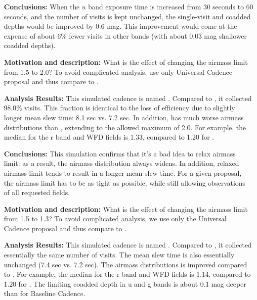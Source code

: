 {\bf Conclusions:} When the $u$ band exposure time is increased from
30 seconds to 60 seconds, and the number of visits is kept unchanged,
the single-visit and coadded depths would be improved by 0.6 mag. This
improvement would come at  the expense of about 6\% fewer visits in
other bands (with about 0.03 mag shallower coadded depths).




{\bf Motivation and description:}  What is the effect of changing the
airmass limit from 1.5 to 2.0?  To avoid complicated analysis, use
only Universal Cadence proposal and thus compare to
.


{\bf Analysis Results:}  This simulated cadence is named
.  Compared to
, it collected 98.0\% visits. This fraction is
identical to the loss of efficiency due to slightly longer mean slew
time: 8.1 sec vs. 7.2 sec. In addition,
 has much worse airmass
distributions than ,  extending to the allowed
maximum of 2.0. For example, the median for the r band and WFD fields
is 1.33, compared to 1.20 for .

{\bf Conclusions:} This simulation confirms that it's a bad idea to
relax airmass limit: as a result, the airmass distribution always
widens. In addition, relaxed airmass limit tends to result in a longer
mean slew time.  For a given proposal, the airmass limit has to be as
tight as possible, while still allowing observations of all requested
fields.




{\bf Motivation and description:} What is the effect of changing the
airmass limit from 1.5 to 1.3? To avoid complicated analysis, we use
only the Universal Cadence proposal and thus compare to
.

 {\bf Analysis Results:}  This simulated cadence is named
 . Compared to
 , it collected essentially the same number of
 visits. The mean slew time is also essentially unchanged (7.4 sec vs.
 7.2 sec). The airmass distributions is improved compared to
 . For example, the median for the r band and
 WFD fields is 1.14, compared to 1.20 for .  The
 limiting coadded depth in u and g bands is about 0.1 mag deeper than
 for Baseline Cadence.

